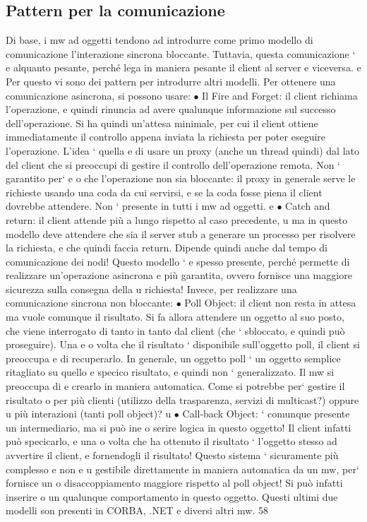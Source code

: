 \documentclass[a4paper,12pt]{article}
\begin{document}
\subsection{Pattern per la comunicazione}
Di base, i mw ad oggetti tendono ad introdurre come primo modello di comunicazione l'interazione sincrona bloccante.
Tuttavia, questa comunicazione `
e
alquanto pesante, perché lega in maniera pesante il client al server e viceversa.
e
Per questo vi sono dei pattern per introdurre altri modelli.
Per ottenere una comunicazione asincrona, si possono usare:
$\bullet$ Il Fire and Forget: il client richiama l'operazione, e quindi rinuncia ad
avere qualunque informazione sul successo dell'operazione. Si ha quindi
un'attesa minimale, per cui il client ottiene immediatamente il controllo
appena inviata la richiesta per poter eseguire l'operazione. L'idea ` quella
e
di usare un proxy (anche un thread quindi) dal lato del client che si preoccupi di gestire il controllo dell'operazione
remota. Non ` garantito per`
e
o
che l'operazione non sia bloccante: il proxy in generale serve le richieste
usando una coda da cui servirsi, e se la coda fosse piena il client dovrebbe
attendere. Non ` presente in tutti i mw ad oggetti.
e
$\bullet$ Catch and return: il client attende più a lungo rispetto al caso precedente,
u
ma in questo modello deve attendere che sia il server stub a generare un
processo per risolvere la richiesta, e che quindi faccia return. Dipende
quindi anche dal tempo di comunicazione dei nodi! Questo modello `
e
spesso presente, perché permette di realizzare un'operazione asincrona
e
più garantita, ovvero fornisce una maggiore sicurezza sulla consegna della
u
richiesta!
Invece, per realizzare una comunicazione sincrona non bloccante:
$\bullet$ Poll Object: il client non resta in attesa ma vuole comunque il risultato.
Si fa allora attendere un oggetto al suo posto, che viene interrogato di
tanto in tanto dal client (che ` sbloccato, e quindi può proseguire). Una
e
o
volta che il risultato ` disponibile sull'oggetto poll, il client si preoccupa
e
di recuperarlo.
In generale, un oggetto poll ` un oggetto semplice ritagliato su quello
e
specico risultato, e quindi non ` generalizzato. Il mw si preoccupa di
e
crearlo in maniera automatica. Come si potrebbe per` gestire il risultato
o
per più clienti (utilizzo della trasparenza, servizi di multicast?) oppure
u
più interazioni (tanti poll object)?
u
$\bullet$ Call-back Object: ` comunque presente un intermediario, ma si può ine
o
serire logica in questo oggetto! Il client infatti può specicarlo, e una
o
volta che ha ottenuto il risultato ` l'oggetto stesso ad avvertire il client,
e
fornendogli il risultato! Questo sistema ` sicuramente più complesso e non
e
u
gestibile direttamente in maniera automatica da un mw, per` fornisce un
o
disaccoppiamento maggiore rispetto al poll object! Si può infatti inserire
o
un qualunque comportamento in questo oggetto.
Questi ultimi due modelli son presenti in CORBA, .NET e diversi altri mw.
58
\end{document}
